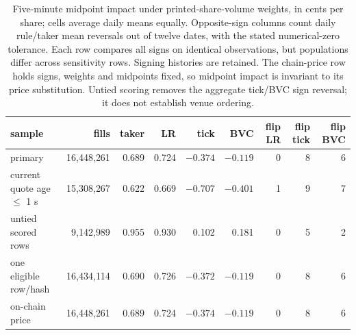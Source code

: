 \begin{table}[htbp]
\centering\scriptsize\setlength{\tabcolsep}{3pt}
\begin{tabular}{lrrrrrrrr}
\toprule
sample & fills & taker & LR & tick & BVC & flip LR & flip tick & flip BVC \\
\midrule
primary & 16{,}448{,}261 & 0.689 & 0.724 & $-0.374$ & $-0.119$ & 0 & 8 & 6 \\
current quote age $\leq$ 1 s & 15{,}308{,}267 & 0.622 & 0.669 & $-0.707$ & $-0.401$ & 1 & 9 & 7 \\
untied scored rows & 9{,}142{,}989 & 0.955 & 0.930 & 0.102 & 0.181 & 0 & 5 & 2 \\
one eligible row/hash & 16{,}434{,}114 & 0.690 & 0.726 & $-0.372$ & $-0.119$ & 0 & 8 & 6 \\
on-chain price & 16{,}448{,}261 & 0.689 & 0.724 & $-0.374$ & $-0.119$ & 0 & 8 & 6 \\
\bottomrule
\end{tabular}
\caption{Five-minute midpoint impact under printed-share-volume weights, in cents per share; cells average daily means equally. Opposite-sign columns count daily rule/taker mean reversals out of twelve dates, with the stated numerical-zero tolerance. Each row compares all signs on identical observations, but populations differ across sensitivity rows. Signing histories are retained. The chain-price row holds signs, weights and midpoints fixed, so midpoint impact is invariant to its price substitution. Untied scoring removes the aggregate tick/BVC sign reversal; it does not establish venue ordering.}
\label{tab:cached-economic-sensitivity}
\end{table}
